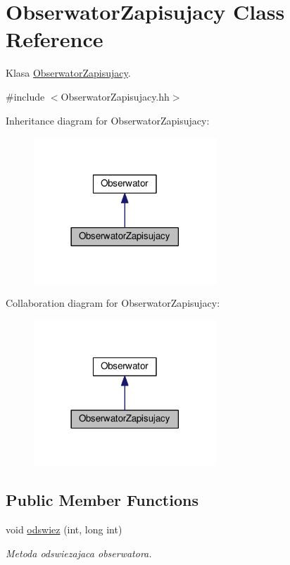 \hypertarget{a00016}{}\section{Obserwator\+Zapisujacy Class Reference}
\label{a00016}


Klasa \hyperlink{a00016}{Obserwator\+Zapisujacy}.  




{\ttfamily \#include $<$Obserwator\+Zapisujacy.\+hh$>$}



Inheritance diagram for Obserwator\+Zapisujacy\+:
\nopagebreak
\begin{figure}[H]
\begin{center}
\leavevmode
\includegraphics[width=194pt]{a00159}
\end{center}
\end{figure}


Collaboration diagram for Obserwator\+Zapisujacy\+:
\nopagebreak
\begin{figure}[H]
\begin{center}
\leavevmode
\includegraphics[width=194pt]{a00160}
\end{center}
\end{figure}
\subsection*{Public Member Functions}
\begin{DoxyCompactItemize}
\item 
void \hyperlink{a00016_ace7d819c70329e85b06a5450f6f7c92f}{odswiez} (int, long int)
\begin{DoxyCompactList}\small\item\em Metoda odswiezajaca obserwatora. \end{DoxyCompactList}\end{DoxyCompactItemize}


